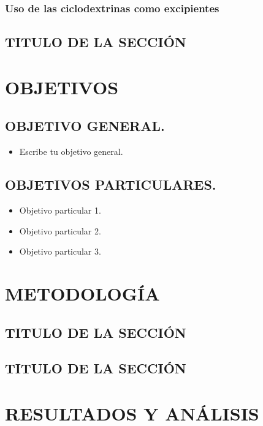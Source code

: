 \documentclass[12pt,oneside]{book} %
\begin{document}
			\subsection{Uso de las ciclodextrinas como excipientes}
		\section{TITULO DE LA SECCIÓN}
		\label{Sec:Titulo2}
			
	
	\chapter{OBJETIVOS}
	\label{Ch:Objetivos}
		\section{OBJETIVO GENERAL.}
			\begin{itemize}
				\item Escribe tu objetivo general. 
			\end{itemize}
		\section{OBJETIVOS PARTICULARES.}
			\begin{itemize}	
				\item Objetivo particular 1.
				\item Objetivo particular 2.
				\item Objetivo particular 3.
			\end{itemize}
			
	\chapter{METODOLOGÍA}
	\label{Ch:Metodología}
		
		\section{TITULO DE LA SECCIÓN}
		\label{Sec:Titulo}
			
		\section{TITULO DE LA SECCIÓN}
		\label{Sec:Titulo2}
		
	\chapter{RESULTADOS Y ANÁLISIS}
	\label{Ch:Resultados}
	
\end{document}
